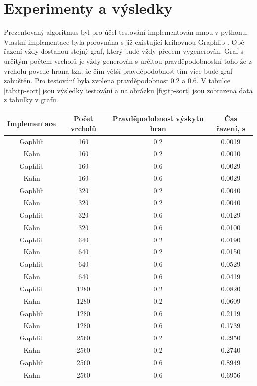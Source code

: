 \documentclass[12pt]{report}
\begin{document}
\section*{Experimenty a výsledky}
	
	Prezentovaný algoritmus byl pro účel testování implementován mnou v pythonu. Vlastní implementace byla porovnána s již existující knihovnou Graphlib \cite{r5}. Obě řazení vždy dostanou stejný graf, který bude vždy předem vygenerován. Graf s určitým počtem vrcholů je vždy generován s určitou pravděpodobnostní toho že z vrcholu povede hrana tzn. že čím větší pravděpodobnost tím více bude graf zahuštěn. Pro testování byla zvolena pravděpodobnost 0.2 a 0.6. V tabulce \ref*{tab:tp-sort} jsou výsledky testování a na obrázku \ref{fig:tp-sort} jsou zobrazena data z tabulky v grafu.
	
	\begin{table}[htbp]
		\centering
		\begin{tabular}{c|c|c|c}
			\hline
			Implementace & Počet vrcholů & Pravděpodobnost výskytu hran & Čas řazení, s\\
			\hline
			Gaphlib & 160 & 0.2 & 0.0019\\
			Kahn & 160 & 0.2 & 0.0010\\
			Gaphlib & 160 & 0.6 & 0.0029\\
			Kahn & 160 & 0.6 & 0.0029\\
			\hline
			Gaphlib & 320 & 0.2 & 0.0040\\
			Kahn & 320 & 0.2 & 0.0040\\
			Gaphlib & 320 & 0.6 & 0.0129\\
			Kahn & 320 & 0.6 & 0.0100\\
			\hline
			Gaphlib & 640 & 0.2 & 0.0190\\
			Kahn & 640 & 0.2 & 0.0150\\
			Gaphlib & 640 & 0.6 & 0.0529\\
			Kahn & 640 & 0.6 & 0.0419\\
			\hline
			Gaphlib & 1280 & 0.2 & 0.0820\\
			Kahn & 1280 & 0.2 & 0.0609\\
			Gaphlib & 1280 & 0.6 & 0.2119\\
			Kahn & 1280 & 0.6 & 0.1739\\
			\hline
			Gaphlib & 2560 & 0.2 & 0.2950\\
			Kahn & 2560 & 0.2 & 0.2740\\
			Gaphlib & 2560 & 0.6 & 0.8949\\
			Kahn & 2560 & 0.6 & 0.6956\\

\end{tabular}
\end{table}
\end{document}
